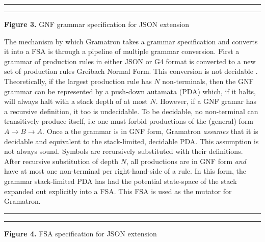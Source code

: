 \documentclass[12pt]{diazessay}
\begin{document}
\vspace{10mm}
\hrule height 0.4mm
\begingroup \fontsize{10pt}{10pt} \selectfont 
\begin{alltt}

\end{alltt} \vspace{-6mm} \endgroup \hrule height 0.4mm
\vspace{6mm}
\centerline{\textbf{Figure 3.} GNF grammar specification for JSON extension}
\vspace{6mm}

The mechanism by which Gramatron takes a grammar specification and converts it into a FSA is through a pipeline of multiple grammar conversion.
First a grammar of production rules in either JSON or G4\cite{parr2013definitive} format is converted to a new set of production rules Greibach Normal Form.
This conversion is not decidable \cite{yu1997regular}.
Theoretically, if the largest production rule has $N$ non-terminals, then the GNF grammar can be represented by a push-down autamata (PDA) which, if it halts, will always halt with a stack depth of at most $N$.
However, if a GNF gramar has a recursive definition, it too is undecidable.
To be decidable, no non-terminal can transitively produce itself, i.e one must forbid productions of the (general) form $A \to B \to A$.
Once a the grammar is in GNF form, Gramatron \emph{assumes} that it is decidable and equivalent to the stack-limited, decidable PDA.
This assumption is not always sound.
Symbols are recursively substituted with their definitions.
After recursive substitution of depth $N$, all productions are in GNF form \emph{and} have at most one non-terminal per right-hand-side of a rule.
In this form, the grammar stack-limited PDA has had the potential state-space of the stack expanded out explicitly into a FSA.
This FSA is used as the mutator for Gramatron.

\vspace{10mm}
\hrule height 0.4mm
\begingroup \fontsize{10pt}{10pt} \selectfont 

\vspace{-6mm} \endgroup \hrule
\vspace{6mm}
\centerline{\textbf{Figure 4.} FSA specification for JSON extension}
\vspace{6mm}
\end{document}
